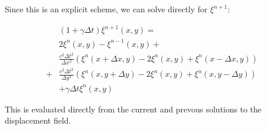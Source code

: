 \documentclass[a4paper,10pt]{article}
\begin{document}
Since this is an explicit scheme, we can solve directly for $\xi^{n+1}$:

\begin{equation}
\begin{aligned}
& (1 + \gamma \Delta t) \xi^{n+1}(x,y) = \\
& 2 \xi^{n}(x,y) - \xi^{n-1}(x,y)   +  \\
 &\frac{ c^2 \Delta t^2}{\Delta x^2} \left( \xi^{n}(x+\Delta x, y)  -2 \xi^{n}(x,y) + \xi^{n}(x-\Delta x, y) \right) \\
 + &\frac{ c^2 \Delta t^2}{\Delta y^2} \left( \xi^{n}(x, y+ \Delta y)  -2 \xi^{n}(x,y) + \xi^{n}(x, y-\Delta y) \right) \\
& + \gamma \Delta t \xi^{n}(x,y)
\end{aligned}
\end{equation}

This is evaluated directly from the current and prevous solutions to the displacement field.
\end{document}
